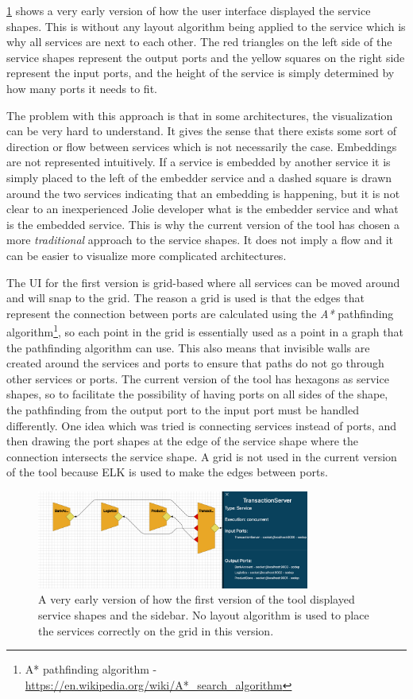 \cref{figure:old_ui} shows a very early version of how the user interface displayed the service shapes. This is without any layout algorithm being applied to the service which is why all services are next to each other.
The red triangles on the left side of the service shapes represent the output ports and the yellow squares on the right side represent the input ports, and the height of the service is simply determined by how many ports it needs to fit.

The problem with this approach is that in some architectures, the visualization can be very hard to understand.
It gives the sense that there exists some sort of direction or flow between services which is not necessarily the case.
Embeddings are not represented intuitively. If a service is embedded by another service it is simply placed to the left of the embedder service and a dashed square is drawn around the two services indicating that an embedding is happening, but it 
is not clear to an inexperienced Jolie developer what is the embedder service and what is the embedded service.
This is why the current version of the tool has chosen a more \emph{traditional} approach to the service shapes. It does not imply a flow and it can be easier to visualize more complicated architectures.

The UI for the first version is grid-based where all services can be moved around and will snap to the grid.
The reason a grid is used is that the edges that represent the connection between ports are calculated using the \emph{A*} pathfinding algorithm\footnote{A* pathfinding algorithm - \url{https://en.wikipedia.org/wiki/A*_search_algorithm}}, so each point in the grid is essentially used as a point in a graph that the pathfinding algorithm can use.
This also means that invisible walls are created around the services and ports to ensure that paths do not go through other services or ports.
The current version of the tool has hexagons as service shapes, so to facilitate the possibility of having ports on all sides of the shape, the pathfinding from the output port to the input port must be handled differently.
One idea which was tried is connecting services instead of ports, and then drawing the port shapes at the edge of the service shape where the connection intersects the service shape.
A grid is not used in the current version of the tool because ELK is used to make the edges between ports.

\begin{figure}[t]
\center
\includegraphics[width=0.8\textwidth]{figures/old_ui.png}
\caption{A very early version of how the first version of the tool displayed service shapes and the sidebar. No layout algorithm is used to place the services correctly on the grid in this version.}
\label{figure:old_ui}
\end{figure}

